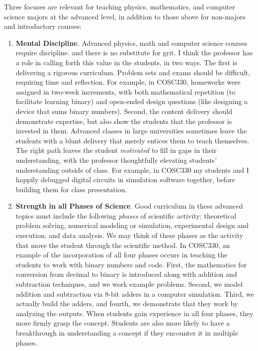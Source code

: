 \documentclass[../../main.tex]{subfiles}
\begin{document}
Three focuses are relevant for teaching physics, mathematics, and computer science majors at the advanced level, in addition to those above for non-majors and introductory courses:
\begin{enumerate}
\item \textbf{Mental Discipline}.  Advanced physics, math and computer science courses require discipline. and there is no substitute for grit.  I think the professor has a role in calling forth this value in the students, in two ways.  The first is delivering a rigorous curriculum.  Problem sets and exams should be difficult, requiring time and reflection.  For example, in COSC330, homeworks were assigned in two-week increments, with both mathematical repetition (to facilitate learning binary) and open-ended design questions (like designing a device that sums binary numbers).  Second, the content delivery should demonstrate expertise, but also show the students that the professor is invested in them.  Advanced classes in large universities sometimes leave the students with a blunt delivery that merely entices them to teach themselves.  The right path leaves the student \textit{motivated} to fill in gaps in their understanding, with the professor thoughtfully elevating students' understanding outside of class.  For example, in COSC330 my students and I happily debugged digital circuits in simulation software together, before building them for class presentation.

\item \textbf{Strength in all Phases of Science}. Good curriculum in these advanced topics must include the following \textit{phases} of scientific activity: theoretical problem solving, numerical modeling or simulation, experimental design and execution, and data analysis.  We may think of these phases as the activity that move the student through the scientific method.  In COSC330, an example of the incorporation of all four phases occurs in teaching the students to work with binary numbers and code.  First, the mathematics for conversion from decimal to binary is introduced along with addition and subtraction techniques, and we work example problems.  Second, we model addition and subtraction via 8-bit adders in a computer simulation.  Third, we actually build the adders, and fourth, we demonstrate that they work by analyzing the outputs.  When students gain experience in all four phases, they more firmly grasp the concept.  Students are also more likely to have a breakthrough in understanding a concept if they encounter it in multiple phases.


\end{enumerate}
\end{document}
